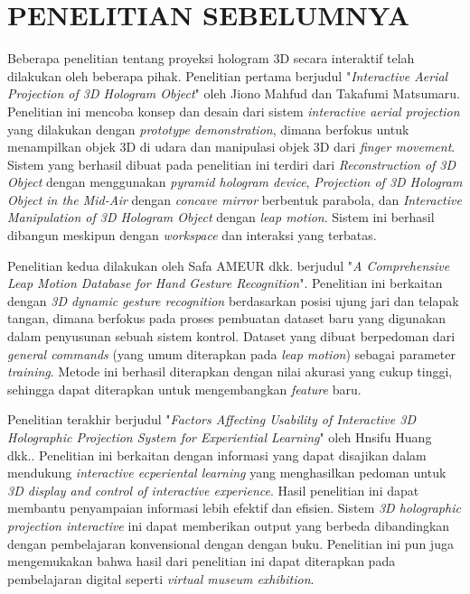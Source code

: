 \documentclass[conference]{IEEEtran}
\begin{document}
\section{PENELITIAN SEBELUMNYA}
	Beberapa penelitian tentang proyeksi hologram 3D secara interaktif telah dilakukan oleh beberapa pihak. Penelitian pertama berjudul "\textit{Interactive Aerial Projection of 3D Hologram Object}" oleh Jiono Mahfud dan Takafumi Matsumaru\cite{mahfud2016interactive}. Penelitian ini mencoba konsep dan desain dari sistem \textit{interactive aerial projection} yang dilakukan dengan \textit{prototype demonstration}, dimana berfokus untuk menampilkan objek 3D di udara dan manipulasi objek 3D dari \textit{finger movement}. Sistem yang berhasil dibuat pada penelitian ini terdiri dari \textit{Reconstruction of 3D Object} dengan menggunakan \textit{pyramid hologram device}, \textit{Projection of 3D Hologram Object in the Mid-Air} dengan \textit{concave mirror} berbentuk parabola, dan \textit{Interactive Manipulation of 3D Hologram Object} dengan \textit{leap motion}. Sistem ini berhasil dibangun meskipun dengan \textit{workspace} dan interaksi yang terbatas.\cite{mahfud2016interactive}
	
	Penelitian kedua dilakukan oleh Safa AMEUR dkk. berjudul "\textit{A Comprehensive Leap Motion Database for Hand Gesture Recognition}"\cite{ameur2016comprehensive}. Penelitian ini berkaitan dengan \textit{3D dynamic gesture recognition} berdasarkan posisi ujung jari dan telapak 	tangan, dimana berfokus pada proses pembuatan dataset baru yang digunakan dalam penyusunan sebuah sistem kontrol. Dataset yang dibuat berpedoman dari \textit{general commands} (yang umum diterapkan pada \textit{leap motion}) sebagai parameter \textit{training}. Metode ini berhasil diterapkan dengan nilai akurasi yang cukup tinggi, sehingga dapat diterapkan untuk mengembangkan \textit{feature} baru.\cite{ameur2016comprehensive}
	
	Penelitian terakhir berjudul "\textit{Factors Affecting Usability of Interactive 3D Holographic Projection System for Experiential Learning}" oleh Hnsifu Huang dkk.\cite{huang2018factors}. Penelitian ini berkaitan dengan informasi yang dapat disajikan dalam mendukung \textit{interactive ecperiental learning} yang menghasilkan pedoman untuk \textit{3D display and control of interactive experience}. Hasil penelitian ini dapat membantu penyampaian informasi lebih efektif dan efisien. Sistem \textit{3D holographic projection interactive} ini dapat memberikan output yang berbeda dibandingkan dengan pembelajaran konvensional dengan dengan buku. Penelitian ini pun juga mengemukakan bahwa hasil dari penelitian ini dapat diterapkan pada pembelajaran digital seperti \textit{virtual museum exhibition}.\cite{huang2018factors}
	
\end{document}
